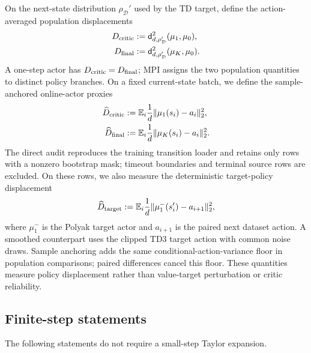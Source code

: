 On the next-state distribution $\rho_{\mathcal D}'$ used by the TD target,
define the action-averaged population displacements
\begin{equation}
\begin{aligned}
D_{\rm critic}&:=\mathsf d_{d,\rho_{\mathcal D}'}^2(\mu_1,\mu_0),\\
D_{\rm final}&:=\mathsf d_{d,\rho_{\mathcal D}'}^2(\mu_K,\mu_0).
\end{aligned}
\label{eq:displacements}
\end{equation}
A one-step actor has $D_{\rm critic}=D_{\rm final}$; MPI assigns the two
population quantities to distinct policy branches. On a fixed current-state
batch, we define the sample-anchored online-actor proxies
\begin{equation}
\begin{aligned}
\widehat D_{\rm critic}
&:=\mathbb E_i\frac{1}{d}\|\mu_1(s_i)-a_i\|_2^2,\\
\widehat D_{\rm final}
&:=\mathbb E_i\frac{1}{d}\|\mu_K(s_i)-a_i\|_2^2.
\end{aligned}
\label{eq:sample_displacements}
\end{equation}
The direct audit reproduces the training transition loader and retains only
rows with a nonzero bootstrap mask; timeout boundaries and terminal source
rows are excluded. On these rows, we also measure the deterministic
target-policy displacement
\begin{equation}
 \widehat D_{\rm target}:=
 \mathbb E_i\frac{1}{d}
 \|\mu_1^-(s_i')-a_{i+1}\|_2^2,
 \label{eq:direct_target_displacement}
\end{equation}
where $\mu_1^-$ is the Polyak target actor and $a_{i+1}$ is the paired next
dataset action. A smoothed counterpart uses the clipped TD3 target action with
common noise draws. Sample anchoring adds the same conditional-action-variance
floor in population comparisons; paired differences cancel this floor. These
quantities measure policy displacement rather than value-target perturbation
or critic reliability.

\subsection{Finite-step statements}

The following statements do not require a small-step Taylor expansion.

